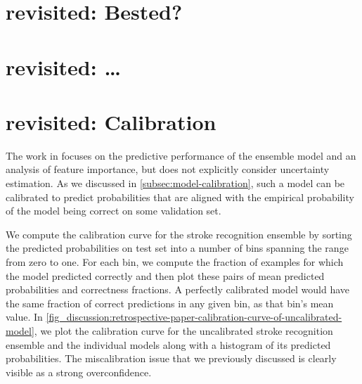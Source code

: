 \section{ revisited: Bested?}



\section{ revisited: \dots} \label{sec:discussion-paper-review}



\section{ revisited: Calibration}
The work in \textcite{wenstrup_retrospective_2023} focuses on the predictive performance of the ensemble model and an analysis of feature importance, but does not explicitly consider uncertainty estimation. 
As we discussed in \cref{subsec:model-calibration}, such a model can be calibrated to predict probabilities that are aligned with the empirical probability of the model being correct on some validation set.

We compute the calibration curve for the stroke recognition ensemble by sorting the predicted probabilities on test set into a number of bins spanning the range from zero to one. For each bin, we compute the fraction of examples for which the model predicted correctly and then plot these pairs of mean predicted probabilities and correctness fractions. A perfectly calibrated model would have the same fraction of correct predictions in any given bin, as that bin's mean value. 
In \cref{fig_discussion:retrospective-paper-calibration-curve-of-uncalibrated-model}, we plot the calibration curve for the uncalibrated stroke recognition ensemble and the individual models along with a histogram of its predicted probabilities. The miscalibration issue that we previously discussed is clearly visible as a strong overconfidence. 

